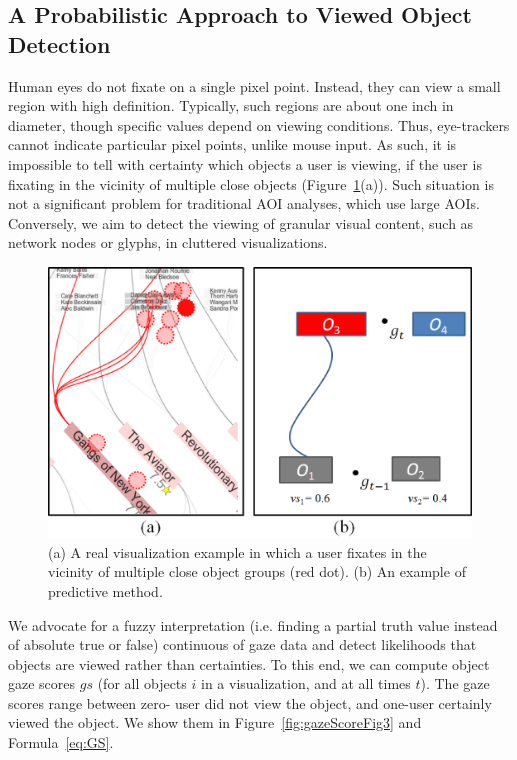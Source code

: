 \subsection{A Probabilistic Approach to Viewed Object Detection}
\label{sec:ProbabilisticObjectDetection}

Human eyes do not fixate on a single pixel point. Instead, they can view a small region with high definition. Typically, such regions are about one inch in diameter, though specific values depend on viewing conditions. Thus, eye-trackers cannot indicate particular pixel points, unlike mouse input. As such, it is impossible to tell with certainty which objects a user is viewing, if the user is fixating in the vicinity of multiple close objects (Figure~\ref{fig:discreminateFig4}(a)). Such situation is not a significant problem for traditional AOI analyses, which use large AOIs. Conversely, we aim to detect the viewing of granular visual content, such as network nodes or glyphs, in cluttered visualizations.

\begin{figure}[htb]
  \centering
  \includegraphics[width=\linewidth]{images/discreminateFig4.eps}
  \caption{(a) A real visualization example in which a user fixates in the vicinity of multiple close object groups (red dot). (b) An example of predictive method.}
	\label{fig:discreminateFig4}
\end{figure}

We advocate for a fuzzy interpretation (i.e. finding a partial truth value instead of absolute true or false) continuous of gaze data and detect likelihoods that objects are viewed rather than certainties. To this end, we can compute object gaze scores $gs$ (for all objects $i$ in a visualization, and at all times $t$). The gaze scores range between zero- user did not view the object, and one-user certainly viewed the object. We show them in Figure~\ref{fig:gazeScoreFig3} and Formula~\ref{eq:GS}. 

